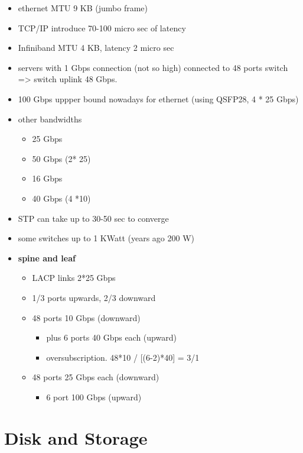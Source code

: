 \begin{itemize}
\item
  ethernet MTU 9 KB (jumbo frame)
\item
  TCP/IP introduce 70-100 micro sec of latency
\item
  Infiniband MTU 4 KB, latency 2 micro sec
\item
  servers with 1 Gbps connection (not so high) connected to 48 ports
  switch =\textgreater{} switch uplink 48 Gbps.
\item
  100 Gbps uppper bound nowadays for ethernet (using QSFP28, 4 * 25
  Gbps)
\item
  other bandwidths

  \begin{itemize}
  \item
    25 Gbps
  \item
    50 Gbps (2* 25)
  \item
    16 Gbps
  \item
    40 Gbps (4 *10)
  \end{itemize}
\item
  STP can take up to 30-50 sec to converge
\item
  some switches up to 1 KWatt (years ago 200 W)
\item
  \textbf{spine and leaf}

  \begin{itemize}
  \item
    LACP links 2*25 Gbps
  \item
    1/3 ports upwards, 2/3 downward
  \item
    48 ports 10 Gbps (downward)

    \begin{itemize}
    \item
      plus 6 ports 40 Gbps each (upward)
    \item
      oversubscription. 48*10 / {[}(6-2)*40{]} = 3/1
    \end{itemize}
  \item
    48 ports 25 Gbps each (downward)

    \begin{itemize}
    \item
      6 port 100 Gbps (upward)
    \end{itemize}
  \end{itemize}
\end{itemize}

\hypertarget{disk-and-storage}{%
\section{Disk and Storage}\label{disk-and-storage}}

